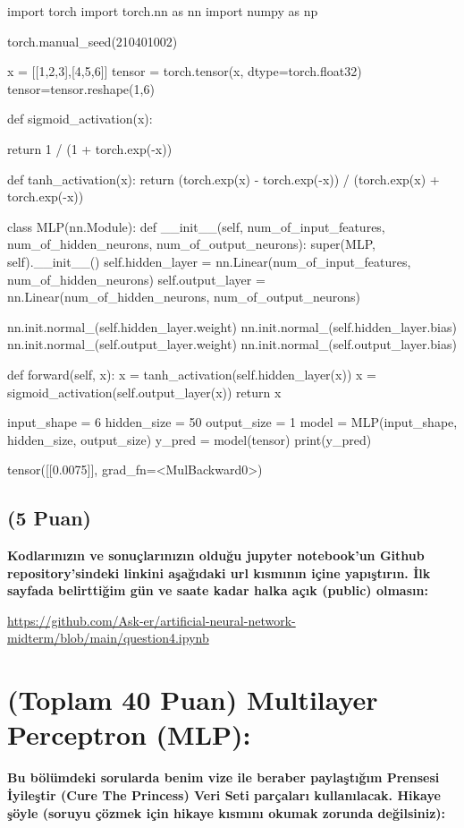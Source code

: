 \documentclass[11pt]{article}
\begin{document}
\begin{python}
import torch
import torch.nn as nn
import numpy as np

torch.manual_seed(210401002)

x = [[1,2,3],[4,5,6]]
tensor = torch.tensor(x, dtype=torch.float32)
tensor=tensor.reshape(1,6)

def sigmoid_activation(x):

  return 1 / (1 + torch.exp(-x))

def tanh_activation(x):
    return (torch.exp(x) - torch.exp(-x)) / (torch.exp(x) + torch.exp(-x)) 

class MLP(nn.Module):
    def __init__(self, num_of_input_features, num_of_hidden_neurons, num_of_output_neurons):
        super(MLP, self).__init__()
        self.hidden_layer = nn.Linear(num_of_input_features, num_of_hidden_neurons)
        self.output_layer = nn.Linear(num_of_hidden_neurons, num_of_output_neurons)

        nn.init.normal_(self.hidden_layer.weight)
        nn.init.normal_(self.hidden_layer.bias)
        nn.init.normal_(self.output_layer.weight)
        nn.init.normal_(self.output_layer.bias)

    def forward(self, x):
        x = tanh_activation(self.hidden_layer(x))
        x = sigmoid_activation(self.output_layer(x))
        return x

input_shape = 6
hidden_size = 50
output_size = 1
model = MLP(input_shape, hidden_size, output_size)
y_pred = model(tensor)
print(y_pred)
\end{python}
{tensor([[0.0075]], grad_fn=<MulBackward0>)}


\subsection{(5 Puan)} \textbf{Kodlarınızın ve sonuçlarınızın olduğu jupyter notebook'un Github repository'sindeki linkini aşağıdaki url kısmının içine yapıştırın. İlk sayfada belirttiğim gün ve saate kadar halka açık (public) olmasın:}

\url{https://github.com/Ask-er/artificial-neural-network-midterm/blob/main/question4.ipynb}

\section{(Toplam 40 Puan) Multilayer Perceptron (MLP):} 
\textbf{Bu bölümdeki sorularda benim vize ile beraber paylaştığım Prensesi İyileştir (Cure The Princess) Veri Seti parçaları kullanılacak. Hikaye şöyle (soruyu çözmek için hikaye kısmını okumak zorunda değilsiniz):} 
\end{document}
